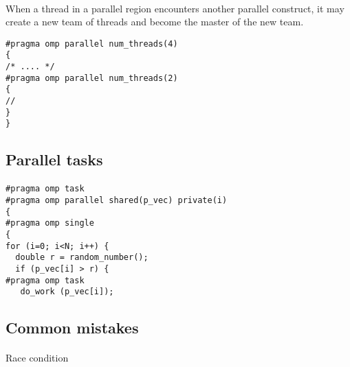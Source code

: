 \documentclass[%
oneside,                 %
final,                   %
10pt]{article}
\begin{document}
\paragraph{}
When a thread in a parallel region encounters another parallel construct, it
may create a new team of threads and become the master of the new
team.









\begin{verbatim}
#pragma omp parallel num_threads(4)
{
/* .... */
#pragma omp parallel num_threads(2)
{
//  
}
}

\end{verbatim}



\subsection*{Parallel tasks}

\paragraph{}











\begin{verbatim}
#pragma omp task 
#pragma omp parallel shared(p_vec) private(i)
{
#pragma omp single
{
for (i=0; i<N; i++) {
  double r = random_number();
  if (p_vec[i] > r) {
#pragma omp task
   do_work (p_vec[i]);

\end{verbatim}



\subsection*{Common mistakes}

\paragraph{}
Race condition
\end{document}
